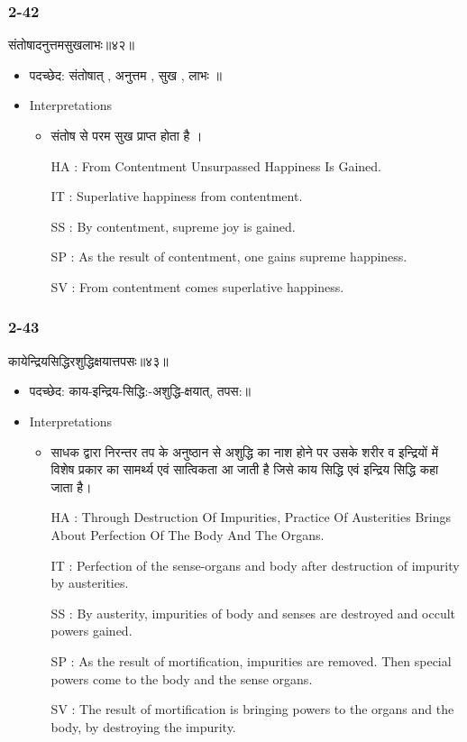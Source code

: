 \begin{frame}[fragile]\frametitle{2-42}
\begin{sanskrit}
संतोषादनुत्तमसुखलाभः॥४२॥
\end{sanskrit}

	\begin{itemize}
	\item पदच्छेद: संतोषात् , अनुत्तम , सुख , लाभः ॥
	\item Interpretations
		\begin{itemize}
		\item संतोष से परम सुख प्राप्त होता है ।
		\item [HA]: From Contentment Unsurpassed Happiness Is Gained.
		\item [IT]: Superlative happiness from contentment.
		\item [SS]: By contentment, supreme joy is gained.
		\item [SP]: As the result of contentment, one gains supreme happiness.
		\item [SV]: From contentment comes superlative happiness. 
		\end{itemize}
	\end{itemize}	
\end{frame}


\begin{frame}[fragile]\frametitle{2-43}
\begin{sanskrit}
कायेन्द्रियसिद्धिरशुद्धिक्षयात्तपसः॥४३॥
\end{sanskrit}

	\begin{itemize}
	\item पदच्छेद: काय-इन्द्रिय-सिद्धि:-अशुद्धि-क्षयात्, तपस:॥
	\item Interpretations
		\begin{itemize}
		\item साधक द्वारा निरन्तर तप के अनुष्ठान से अशुद्धि का नाश होने पर उसके शरीर व इन्द्रियों में विशेष प्रकार का सामर्थ्य एवं सात्विकता आ जाती है जिसे काय सिद्धि एवं इन्द्रिय सिद्धि कहा जाता है।
		\item [HA]: Through Destruction Of Impurities, Practice Of Austerities Brings About Perfection Of The Body And The Organs.
		\item [IT]: Perfection of the sense-organs and body after destruction of impurity by austerities.
		\item [SS]: By austerity, impurities of body and senses are destroyed and occult powers gained.
		\item [SP]: As the result of mortification, impurities are removed. Then special powers come to the body and the sense organs.
		\item [SV]: The result of mortification is bringing powers to the organs and the body, by destroying the impurity. 
		\end{itemize}
	\end{itemize}	
\end{frame}

